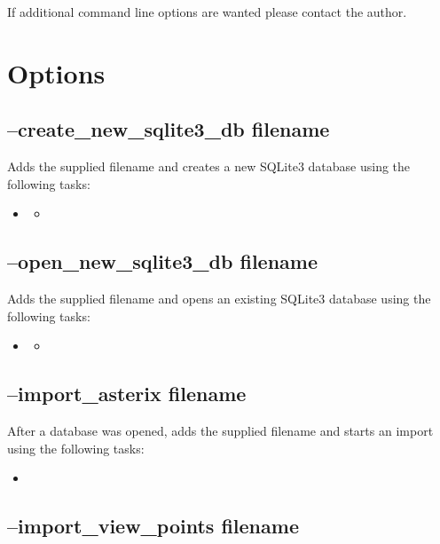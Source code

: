 If additional command line options are wanted please contact the author.

\section{Options}

\subsection{--create\_new\_sqlite3\_db filename}

Adds the supplied filename and creates a new SQLite3 database using the following tasks:

\begin{itemize}
\item {}
\begin{itemize}
 \item {}
 \end{itemize}
 \end{itemize}
 
\subsection{--open\_new\_sqlite3\_db filename}

Adds the supplied filename and opens an existing SQLite3 database using the following tasks:

\begin{itemize}
\item {}
\begin{itemize}
 \item {}
 \end{itemize}
 \end{itemize}
 
\subsection{--import\_asterix filename}

After a database was opened, adds the supplied filename and starts an import using the following tasks:

\begin{itemize}
 \item {}
\end{itemize}

\subsection{--import\_view\_points filename}

